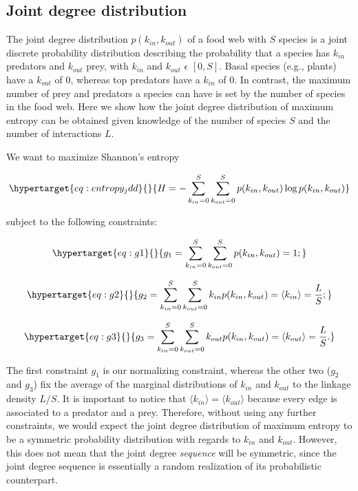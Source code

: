 \documentclass[10pt,oneside]{article}
\begin{document}
\hypertarget{joint-degree-distribution}{%
\subsection{Joint degree distribution}\label{joint-degree-distribution}}

The joint degree distribution \(p(k_{in},k_{out})\) of a food web with
\(S\) species is a joint discrete probability distribution describing
the probability that a species has \(k_{in}\) predators and \(k_{out}\)
prey, with \(k_{in}\) and \(k_{out}\) \(\epsilon\) \([0, S]\). Basal
species (e.g., plants) have a \(k_{out}\) of \(0\), whereas top
predators have a \(k_{in}\) of \(0\). In contrast, the maximum number of
prey and predators a species can have is set by the number of species in
the food web. Here we show how the joint degree distribution of maximum
entropy can be obtained given knowledge of the number of species \(S\)
and the number of interactions \(L\).

We want to maximize Shannon's entropy

\begin{equation}\protect\hypertarget{eq:entropy_jdd}{}{H = -\sum_{k_{in}=0}^S\sum_{k_{out}=0}^S p(k_{in},k_{out}) \log p(k_{in},k_{out})}\label{eq:entropy_jdd}\end{equation}

subject to the following constraints:

\begin{equation}\protect\hypertarget{eq:g1}{}{g_1 = \sum_{k_{in}=0}^S\sum_{k_{out}=0}^S p(k_{in},k_{out}) = 1;}\label{eq:g1}\end{equation}

\begin{equation}\protect\hypertarget{eq:g2}{}{g_2 = \sum_{k_{in}=0}^S\sum_{k_{out}=0}^S k_{in} p(k_{in},k_{out}) = \langle k_{in} \rangle = \frac{L}{S};}\label{eq:g2}\end{equation}

\begin{equation}\protect\hypertarget{eq:g3}{}{g_3 = \sum_{k_{in}=0}^S\sum_{k_{out}=0}^S k_{out} p(k_{in},k_{out}) = \langle k_{out} \rangle = \frac{L}{S}.}\label{eq:g3}\end{equation}

The first constraint \(g_1\) is our normalizing constraint, whereas the
other two (\(g_2\) and \(g_3\)) fix the average of the marginal
distributions of \(k_{in}\) and \(k_{out}\) to the linkage density
\(L/S\). It is important to notice that
\(\langle k_{in} \rangle = \langle k_{out} \rangle\) because every edge
is associated to a predator and a prey. Therefore, without using any
further constraints, we would expect the joint degree distribution of
maximum entropy to be a symmetric probability distribution with regards
to \(k_{in}\) and \(k_{out}\). However, this does not mean that the
joint degree \emph{sequence} will be symmetric, since the joint degree
sequence is essentially a random realization of its probabilistic
counterpart.
\end{document}
